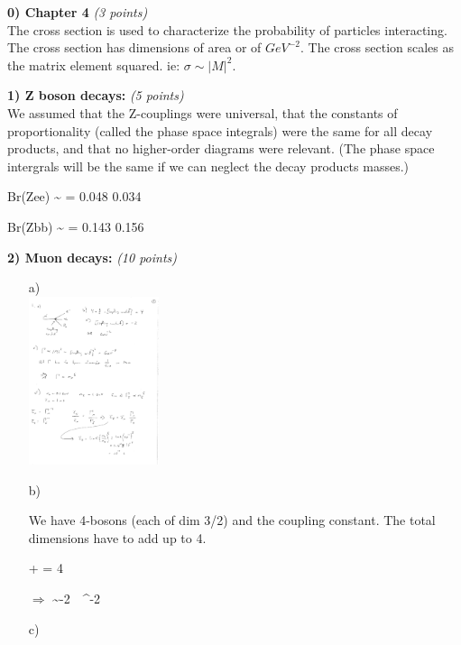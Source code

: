 {\large

\textbf{0) Chapter 4 } \hfill \textit{(3 points)}\\


The cross section is used to characterize the probability of particles interacting.
The cross section has dimensions of area or of $GeV^{-2}$.
The cross section scales as the matrix element squared. ie: $\sigma \sim |M|^2$.



\textbf{1) Z boson decays: } \hfill \textit{(5 points)}\\

We assumed that the Z-couplings were universal, that the constants of proportionality (called the phase space integrals) were the same for all decay products, and that no higher-order diagrams were relevant. 
(The phase space intergrals will be the same if we can neglect the decay products masses.)

\be
Br(Z\rightarrow ee) \sim {} = 0.048  0.034  
\ee

\be
Br(Z\rightarrow bb) \sim {} = 0.143  0.156  
\ee


\textbf{2) Muon decays: } \hfill \textit{(10 points)}\\
\begin{itemize}
\item[a)]{ ${ }$\\
\bc
\includegraphics[width=0.3\textwidth]{./4pointInteraction.pdf}
\ec
}

\item[b)]{ We have 4-bosons (each of dim 3/2)  and the coupling constant.  The total dimensions have to add up to 4. 

 \times {} +  = 4
\ee

$\Rightarrow$
\be
  \sim  -2\ \ \GeV^{-2}
\ee

}

\item[c)]{ 

}
\end{itemize}}
